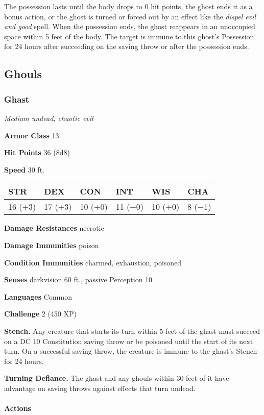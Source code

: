 \documentclass[
]{article}
\begin{document}
The possession lasts until the body drops to 0 hit points, the ghost
ends it as a bonus action, or the ghost is turned or forced out by an
effect like the \emph{dispel evil and good} spell. When the possession
ends, the ghost reappears in an unoccupied space within 5 feet of the
body. The target is immune to this ghost's Possession for 24 hours after
succeeding on the saving throw or after the possession ends.

\hypertarget{ghouls}{%
\subsection{Ghouls}\label{ghouls}}

\hypertarget{ghast}{%
\subsubsection{Ghast}\label{ghast}}

\emph{Medium undead, chaotic evil}

\textbf{Armor Class} 13

\textbf{Hit Points} 36 (8d8)

\textbf{Speed} 30 ft.

\begin{longtable}[]{@{}llllll@{}}
\toprule
STR & DEX & CON & INT & WIS & CHA\tabularnewline
\midrule
\endhead
16 (+3) & 17 (+3) & 10 (+0) & 11 (+0) & 10 (+0) & 8 (−1)\tabularnewline
\bottomrule
\end{longtable}

\textbf{Damage Resistances} necrotic

\textbf{Damage Immunities} poison

\textbf{Condition Immunities} charmed, exhaustion, poisoned

\textbf{Senses} darkvision 60 ft., passive Perception 10

\textbf{Languages} Common

\textbf{Challenge} 2 (450 XP)

\textbf{Stench.} Any creature that starts its turn within 5 feet of the
ghast must succeed on a DC 10 Constitution saving throw or be poisoned
until the start of its next turn. On a successful saving throw, the
creature is immune to the ghast's Stench for 24 hours.

\textbf{Turning Defiance.} The ghast and any ghouls within 30 feet of it
have advantage on saving throws against effects that turn undead.

\hypertarget{actions-4}{%
\paragraph{Actions}\label{actions-4}}
\end{document}
